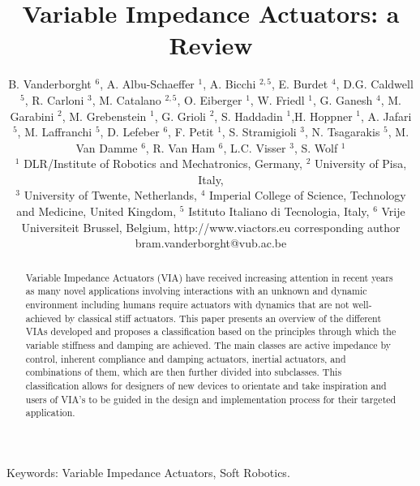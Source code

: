 \documentclass[10pt]{article}
\title{Variable Impedance Actuators: a Review }
\author{B. Vanderborght ${ }^{6}$, A. Albu-Schaeffer ${ }^{1}$, A. Bicchi ${ }^{2,5}$, E. Burdet ${ }^{4}$, D.G. Caldwell ${ }^{5}$, R. Carloni ${ }^{3}$, M. Catalano ${ }^{2,5}$, O. Eiberger ${ }^{1}$, W. Friedl ${ }^{1}$, G. Ganesh ${ }^{4}$, M. Garabini ${ }^{2}$, M. Grebenstein ${ }^{1}$, G. Grioli ${ }^{2}$, S. Haddadin ${ }^{1}$,H. Hoppner ${ }^{1}$, A. Jafari ${ }^{5}$, M. Laffranchi ${ }^{5}$, D. Lefeber ${ }^{6}$, F. Petit ${ }^{1}$, S. Stramigioli ${ }^{3}$, N. Tsagarakis ${ }^{5}$, M. Van Damme ${ }^{6}$, R. Van Ham ${ }^{6}$, L.C. Visser ${ }^{3}$, S. Wolf ${ }^{1}$\\
${ }^{1}$ DLR/Institute of Robotics and Mechatronics, Germany, ${ }^{2}$ University of Pisa, Italy,\\
${ }^{3}$ University of Twente, Netherlands, ${ }^{4}$ Imperial College of Science, Technology and Medicine, United Kingdom, ${ }^{5}$ Istituto Italiano di Tecnologia, Italy, ${ }^{6}$ Vrije Universiteit Brussel, Belgium, http://www.viactors.eu corresponding author\\
bram.vanderborght@vub.ac.be}
\date{}
\begin{document}
\maketitle
\captionsetup{singlelinecheck=false}


\begin{abstract}
Variable Impedance Actuators (VIA) have received increasing attention in recent years as many novel applications involving interactions with an unknown and dynamic environment including humans require actuators with dynamics that are not well-achieved by classical stiff actuators. This paper presents an overview of the different VIAs developed and proposes a classification based on the principles through which the variable stiffness and damping are achieved. The main classes are active impedance by control, inherent compliance and damping actuators, inertial actuators, and combinations of them, which are then further divided into subclasses. This classification allows for designers of new devices to orientate and take inspiration and users of VIA's to be guided in the design and implementation process for their targeted application.
\end{abstract}

Keywords: Variable Impedance Actuators, Soft Robotics.
\end{document}
